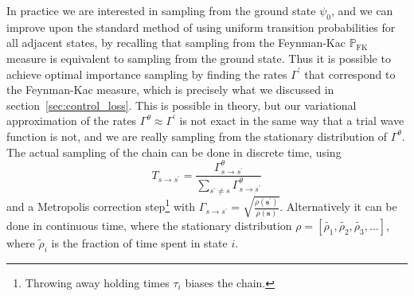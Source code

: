 In practice we are interested in sampling from the ground state $\psi_0$, and we can improve upon the standard method of using uniform transition probabilities for all adjacent states, by recalling that sampling from the Feynman-Kac $\mathbb{P}_\text{FK}$ measure is equivalent to sampling from the ground state. Thus it is possible to achieve optimal importance sampling by finding the rates $\Gamma^\prime$ that correspond to the Feynman-Kac measure, which is precisely what we discussed in section~\ref{sec:control_loss}. This is possible in theory, but our variational approximation of the rates $\Gamma^{\theta} \approx \Gamma^\prime$ is not exact in the same way that a trial wave function is not, and we are really sampling from the stationary distribution of $\Gamma^\theta$. The actual sampling of the chain can be done in discrete time, using
\begin{equation}
	T_{s \rightarrow s^{\prime}}=\frac{\Gamma_{s \rightarrow s^{\prime}}^{\theta}}{\sum_{s^{\prime} \neq s} \Gamma_{s \rightarrow s^{\prime}}^{\theta}}
\end{equation}
and a Metropolis correction step\footnote{Throwing away holding times $\tau_i$ biases the chain.} with $\Gamma_{s \rightarrow s^{\prime}}=\sqrt{\frac{\rho\left(\boldsymbol{s}^{\prime}\right)}{\rho(\boldsymbol{s})}}$. Alternatively it can be done in continuous time, where the stationary distribution $\rho = \left[ \tilde{\rho_1}, \tilde{\rho_2}, \tilde{\rho_3}, \ldots \right]$, where $\tilde \rho_i$ is the fraction of time spent in state $i$. 

